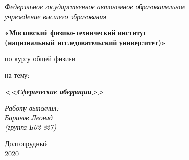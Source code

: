 \thispagestyle{empty}
\begin{center}
    \textit{Федеральное государственное автономное образовательное\\ учреждение высшего образования }

    \vspace{0.5ex}

        \textbf{«Московский физико-технический институт\\ (национальный исследовательский университет)»}
\end{center}

\vspace{10ex}

\begin{center}
    \vspace{13ex}


    \vspace{1ex}

    по курсу общей физики

    на тему:

    \textbf{\textit{<<Сферические аберрации>>}}

    \vspace{30ex}

    \begin{flushright}
        \noindent
        \textit{Работу выполнил:}\\  
        \textit{Баринов Леонид \\(группа Б02-827)}
    \end{flushright}
    \vfill
    Долгопрудный \\2020
\newpage
\setcounter{page}{1}
\fancyhead[R]{\nouppercase{\leftmark}}	
\end{center}
